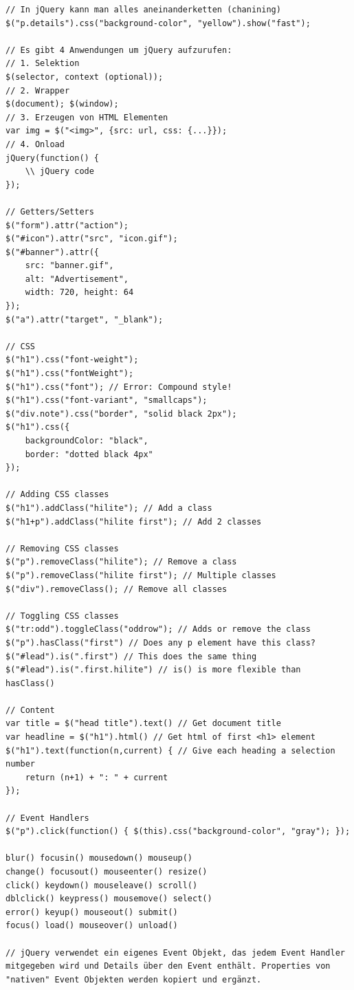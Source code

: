 \begin{lstlisting}[label=lst:jquery-samples,caption=jQuery]
// In jQuery kann man alles aneinanderketten (chanining)
$("p.details").css("background-color", "yellow").show("fast");

// Es gibt 4 Anwendungen um jQuery aufzurufen:
// 1. Selektion
$(selector, context (optional)); 
// 2. Wrapper
$(document); $(window);
// 3. Erzeugen von HTML Elementen
var img = $("<img>", {src: url, css: {...}});
// 4. Onload
jQuery(function() {
	\\ jQuery code
});

// Getters/Setters
$("form").attr("action");
$("#icon").attr("src", "icon.gif");
$("#banner").attr({
	src: "banner.gif",
	alt: "Advertisement",
	width: 720, height: 64
});
$("a").attr("target", "_blank");

// CSS
$("h1").css("font-weight");
$("h1").css("fontWeight");
$("h1").css("font"); // Error: Compound style!
$("h1").css("font-variant", "smallcaps");
$("div.note").css("border", "solid black 2px");
$("h1").css({
	backgroundColor: "black",
	border: "dotted black 4px"
});

// Adding CSS classes
$("h1").addClass("hilite"); // Add a class
$("h1+p").addClass("hilite first"); // Add 2 classes

// Removing CSS classes
$("p").removeClass("hilite"); // Remove a class
$("p").removeClass("hilite first"); // Multiple classes
$("div").removeClass(); // Remove all classes

// Toggling CSS classes
$("tr:odd").toggleClass("oddrow"); // Adds or remove the class
$("p").hasClass("first") // Does any p element have this class?
$("#lead").is(".first") // This does the same thing
$("#lead").is(".first.hilite") // is() is more flexible than hasClass()

// Content
var title = $("head title").text() // Get document title
var headline = $("h1").html() // Get html of first <h1> element
$("h1").text(function(n,current) { // Give each heading a selection number
	return (n+1) + ": " + current
});

// Event Handlers
$("p").click(function() { $(this).css("background-color", "gray"); });

blur() focusin() mousedown() mouseup()
change() focusout() mouseenter() resize()
click() keydown() mouseleave() scroll()
dblclick() keypress() mousemove() select()
error() keyup() mouseout() submit()
focus() load() mouseover() unload()

// jQuery verwendet ein eigenes Event Objekt, das jedem Event Handler mitgegeben wird und Details über den Event enthält. Properties von "nativen" Event Objekten werden kopiert und ergänzt.


\end{lstlisting}

